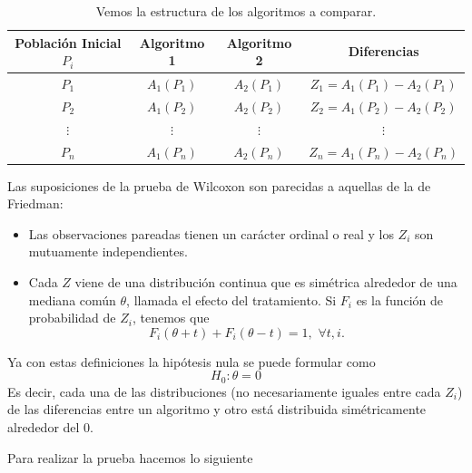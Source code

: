 \begin{table}[H]
    \centering
    \begin{tabular}{|c|c|c|c|}
    \textbf{Población Inicial $P_i$} & \textbf{Algoritmo 1} & \textbf{Algoritmo 2} & \textbf{Diferencias}    \\ \hline
    $P_1$                            & $A_1(P_1)$           & $A_2(P_1)$           & $Z_1=A_1(P_1)-A_2(P_1)$ \\
    $P_2$                            & $A_1(P_2)$           & $A_2(P_2)$           & $Z_2=A_1(P_2)-A_2(P_2)$ \\
    $\vdots$                         & $\vdots$             & $\vdots$             & $\vdots$                \\
    $P_n$                            & $A_1(P_n)$           & $A_2(P_n)$           & $Z_n=A_1(P_n)-A_2(P_n)$
    \end{tabular}
\caption[Algoritmos a comparar]{Vemos la estructura de los algoritmos a comparar.}
\label{tab:datos_pareados}
\end{table}


Las suposiciones de la prueba de Wilcoxon \cite{hollanderNonparametricStatisticalMethods2015} son parecidas a aquellas de la de Friedman:

\begin{itemize}
    \item Las observaciones pareadas tienen un carácter ordinal o real y los $Z_i$ son mutuamente independientes. 
    \item Cada $Z$ viene de una distribución continua que es simétrica alrededor de una mediana común $\theta$, llamada el efecto del tratamiento. Si $F_i$ es la función de probabilidad de $Z_i$, tenemos que 
    $$ F_i(\theta+t)+F_i(\theta -t)=1, \,\, \forall t, i .$$
\end{itemize}

Ya con estas definiciones la hipótesis nula se puede formular como $$ H_0: \theta=0 $$
Es decir, cada una de las distribuciones (no necesariamente iguales entre cada $Z_i$)  de las diferencias entre un algoritmo y otro está distribuida simétricamente alrededor del 0. 

Para realizar la prueba hacemos lo siguiente 


